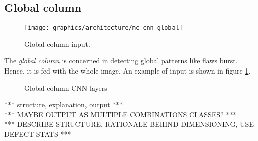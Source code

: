     \subsection{Global column}\label{section:global-column}
        \begin{figure}
            \centering
            \texttt{[image: graphics/architecture/mc-cnn-global]}
            \caption{Global column input.}\label{fig:mc-cnn:global-input}
        \end{figure}
        \par{
            The \emph{global column} is concerned in detecting global patterns like flaws burst. Hence, it is fed with the whole image. An example of input is shown in figure \ref{fig:mc-cnn:global-input}.
        }
        \begin{figure}
            \centering
            \caption{Global column CNN layers}\label{fig:mc-cnn:global-structure}
        \end{figure}
        \par{
            *** structure, explanation, output ***\\
            *** MAYBE OUTPUT AS MULTIPLE COMBINATIONS CLASSES? *** \\
            *** DESCRIBE STRUCTURE, RATIONALE BEHIND DIMENSIONING, USE DEFECT STATS ***
        }
